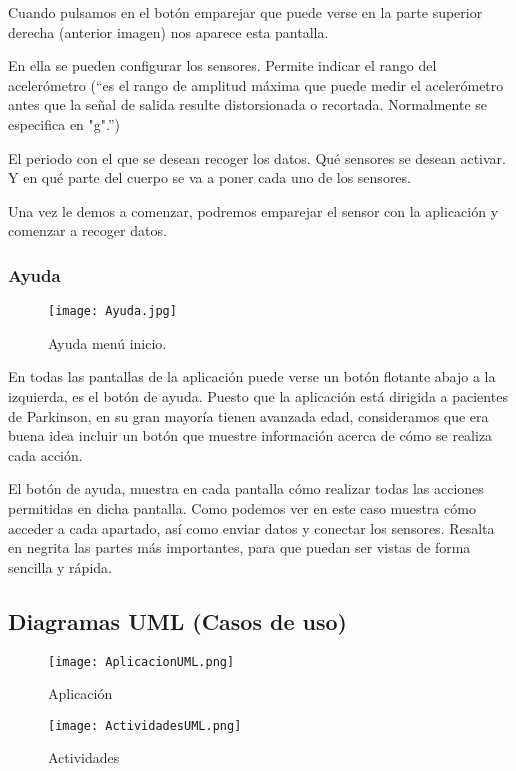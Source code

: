 \documentclass[11pt,spanish]{article}
\begin{document}
Cuando pulsamos en el botón emparejar que puede verse en la parte superior derecha (anterior imagen) nos aparece esta pantalla.

En ella se pueden configurar los sensores. Permite indicar el rango del acelerómetro (“es el rango de amplitud máxima que puede medir el acelerómetro antes que la señal de salida resulte distorsionada o recortada. Normalmente se especifica en "g".”)
\newline

El periodo con el que se desean recoger los datos.
Qué sensores se desean activar.
Y en qué parte del cuerpo se va a poner cada uno de los sensores.
\newline

Una vez le demos a comenzar, podremos emparejar el sensor con la aplicación y comenzar a recoger datos.
\newline

\subsubsection{Ayuda}
\begin{figure}[!htb]
\centering
\texttt{[image: Ayuda.jpg]}
\caption{Ayuda menú inicio.}
\end{figure}

En todas las pantallas de la aplicación puede verse un botón flotante abajo a la izquierda, es el botón de ayuda. Puesto que la aplicación está dirigida a pacientes de Parkinson, en su gran mayoría tienen avanzada edad, consideramos que era buena idea incluir un botón que muestre información acerca de cómo se realiza cada acción.
\newline

El botón de ayuda, muestra en cada pantalla cómo realizar todas las acciones permitidas en dicha pantalla. Como podemos ver en este caso muestra cómo acceder a cada apartado, así como enviar datos y conectar los sensores. Resalta en negrita las partes más importantes, para que puedan ser vistas de forma sencilla y rápida.
\newpage

\subsection{Diagramas UML (Casos de uso)}
\begin{figure}[!htb]
  \texttt{[image: AplicacionUML.png]}
  \caption{Aplicación}
\endminipage\hfill
{}
  \texttt{[image: ActividadesUML.png]}
  \caption{Actividades}
\endminipage\hfill
\end{figure}
\end{document}
